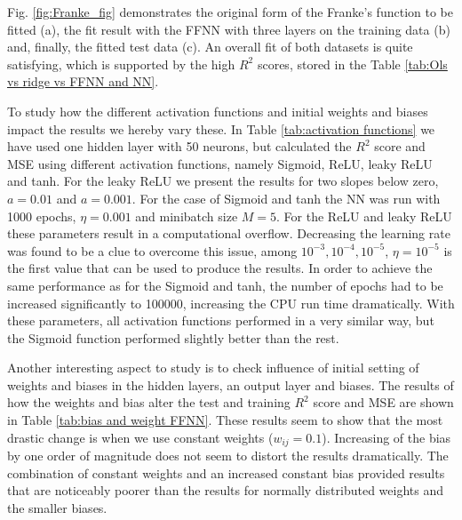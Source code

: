 \documentclass{emulateapj}
\begin{document}
Fig. \ref{fig:Franke_fig} demonstrates the original form of the Franke's function to be fitted (a), the fit result with the FFNN with three layers on the training data (b) and, finally, the fitted test data (c). An overall fit of both datasets is quite satisfying, which is supported by the high $R^2$ scores, stored in the Table \ref{tab:Ols vs ridge vs FFNN and NN}.


To study how the different activation functions and initial weights and biases impact the results we hereby vary these. In Table \ref{tab:activation functions} we have used one hidden layer with 50 neurons, but calculated the $R^{2}$ score and MSE using different activation functions, namely Sigmoid, ReLU, leaky ReLU and tanh. For the leaky ReLU we present the results for two slopes below zero, $a=0.01$ and $a=0.001$. For the case of Sigmoid and tanh the NN was run with 1000 epochs, $\eta=0.001$ and minibatch size $M=5$. For the ReLU and leaky ReLU these parameters result in a computational overflow. Decreasing the learning rate was found to be a clue to overcome this issue, among $10^{-3},10^{-4},10^{-5}$, $\eta=10^{-5}$ is the first value that can be used to produce the results. In order to achieve the same performance as for the Sigmoid and tanh, the number of epochs had to be increased significantly to 100000, increasing the CPU run time dramatically. With these parameters, all activation functions performed in a very similar way, but the Sigmoid function performed slightly better than the rest. 


Another interesting aspect to study is to check influence of initial setting of weights and biases in the hidden layers, an output layer and biases. The results of how the weights and bias alter the test and training $R^{2}$ score and MSE are shown in Table \ref{tab:bias and weight FFNN}. These results seem to show that the most drastic change is when we use constant weights ($w_{ij}=0.1$). Increasing of the bias by one order of magnitude does not seem to distort the results dramatically. The combination of constant weights and an increased constant bias provided results that are noticeably poorer than the results for normally distributed weights and the smaller biases.
\end{document}
